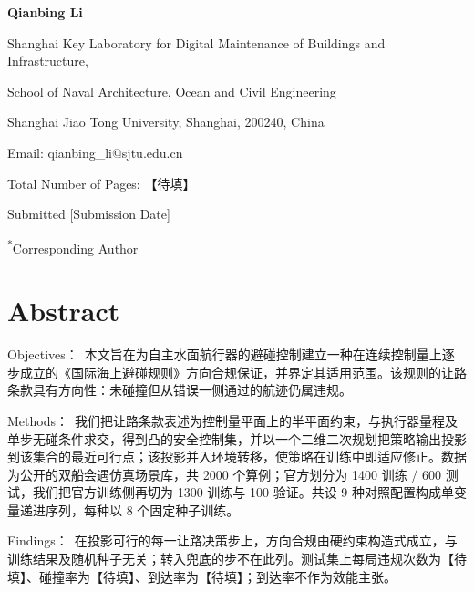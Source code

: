 \documentclass[12pt,letterpaper]{article}
\newcommand{\abshead}[1]{#1\ }
\newcommand{\TBD}{【待填】}
\begin{document}
\begin{flushleft}
{\bfseries Qianbing Li}\par
Shanghai Key Laboratory for Digital Maintenance of Buildings and Infrastructure,\par
School of Naval Architecture, Ocean and Civil Engineering\par
Shanghai Jiao Tong University, Shanghai, 200240, China\par
Email: qianbing\_li@sjtu.edu.cn\par
\vspace{12pt}

Total Number of Pages: \TBD\par
\vspace{24pt}

Submitted [Submission Date]\par
\textsuperscript{*}Corresponding Author\par
\end{flushleft}

\newpage  %

\section*{Abstract}

\justifying

\abshead{Objectives：}本文旨在为自主水面航行器的避碰控制建立一种在连续控制量上逐步成立的《国际海上避碰规则》方向合规保证，并界定其适用范围。该规则的让路条款具有方向性：未碰撞但从错误一侧通过的航迹仍属违规。

\abshead{Methods：}我们把让路条款表述为控制量平面上的半平面约束，与执行器量程及单步无碰条件求交，得到凸的安全控制集，并以一个二维二次规划把策略输出投影到该集合的最近可行点；该投影并入环境转移，使策略在训练中即适应修正。数据为公开的双船会遇仿真场景库，共 2000 个算例；官方划分为 1400 训练 / 600 测试，我们把官方训练侧再切为 1300 训练与 100 验证。共设 9 种对照配置构成单变量递进序列，每种以 8 个固定种子训练。

\abshead{Findings：}在投影可行的每一让路决策步上，方向合规由硬约束构造式成立，与训练结果及随机种子无关；转入兜底的步不在此列。测试集上每局违规次数为\TBD、碰撞率为\TBD、到达率为\TBD；到达率不作为效能主张。
\end{document}
